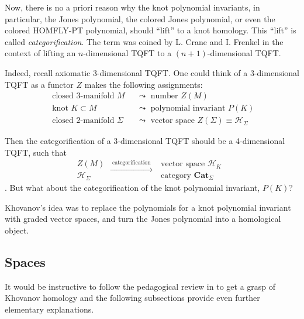 \documentclass[a4paper,titlepage,twoside]{book}
\begin{document}
Now, there is no a priori reason why the knot polynomial invariants, in particular, the Jones polynomial, the colored Jones polynomial, or even the colored HOMFLY-PT polynomial, should ``lift'' to a knot homology.  This ``lift'' is called \emph{categorification}.  The term was coined by L. Crane and I. Frenkel \cite{CraneFrenkel1994} in the context of lifting an $n$-dimensional TQFT to a $(n+1)$-dimensional TQFT.  

Indeed, recall axiomatic 3-dimensional TQFT.  One could think of a 3-dimensional TQFT  as a functor $Z$ makes the following assignments:
\[
\begin{aligned}
\text{ closed 3-manifold $M$ }  & \leadsto \text{ number $Z(M)$}  \\
\text{ knot $K \subset M$ }  & \leadsto \text{ polynomial invariant $P(K)$}  \\
\text{ closed 2-manifold $\Sigma$ } & \leadsto \text{ vector space $Z{(\Sigma)} \equiv \mathcal{H}_{\Sigma}$ } 
\end{aligned}
\]

Then the categorification of a 3-dimensional TQFT should be a 4-dimensional TQFT, such that
\[
\begin{aligned}
  Z(M)  \\
  \mathcal{H}_{\Sigma}
\end{aligned} \xrightarrow{ \text{ categorification } } \begin{aligned}
\text{ vector space $\mathcal{H}_K$ } \\
\text{ category $\textbf{Cat}_{\Sigma}$ } \end{aligned}
\]
\cite{CraneFrenkel1994}.  But what about the categorification of the knot polynomial invariant, $P(K)$?  


Khovanov's idea was to replace the polynomials for a knot polynomial invariant with graded vector spaces, and turn the Jones polynomial into a homological object.  

\subsection{Spaces }

It would be instructive to follow the pedagogical review in \cite{Bar-Natan2002} to get a grasp of Khovanov homology and the following subsections provide even further elementary explanations. 
\end{document}
